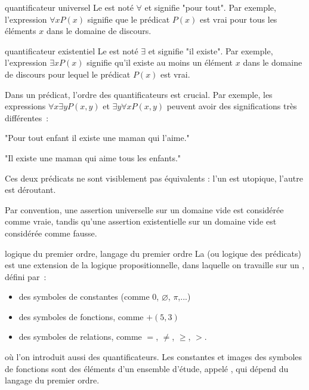 \begin{definition}{}{quantificateur universel}
    Le  est noté $\forall$ et signifie "pour tout". Par exemple, l'expression $\forall x P(x)$ signifie que le prédicat $P(x)$ est vrai pour tous les éléments $x$ dans le domaine de discours.
\end{definition}

\begin{definition}{}{quantificateur existentiel}
    Le  est noté $\exists$ et signifie "il existe". Par exemple, l'expression $\exists x P(x)$ signifie qu'il existe au moins un élément $x$ dans le domaine de discours pour lequel le prédicat $P(x)$ est vrai.
\end{definition}

\begin{remarque}{}{}
    Dans un prédicat, l'ordre des quantificateurs est crucial. Par exemple, les expressions $\forall x \exists y P(x, y)$ et $\exists y \forall x P(x, y)$ peuvent avoir des significations très différentes~:
    \begin{center}
        "Pour tout enfant il existe une maman qui l'aime."
    \end{center}
    \begin{center}
        "Il existe une maman qui aime tous les enfants."
    \end{center}
    Ces deux prédicats ne sont visiblement pas équivalents : l'un est utopique, l'autre est déroutant.
\end{remarque}

\begin{remarque}{}{}
    Par convention, une assertion universelle sur un domaine vide est considérée comme vraie, tandis qu'une assertion existentielle sur un domaine vide est considérée comme fausse.
\end{remarque}


\begin{definition}{}{logique du premier ordre, langage du premier ordre}
    La  (ou logique des prédicats) est une extension de la logique propositionnelle, dans laquelle on travaille sur un , défini par~:
    \begin{itemize}
        \item des symboles de constantes (comme $0$, $\varnothing$, $\pi$,...)
        \item des symboles de fonctions, comme $+ (5,3)$
        \item des symboles de relations, comme $=$, $\neq$, $\geq$, $>$.
    \end{itemize}
    où l'on introduit aussi des quantificateurs. Les constantes et images des symboles de fonctions sont des éléments d'un ensemble d'étude, appelé , qui dépend du langage du premier ordre.
\end{definition}

